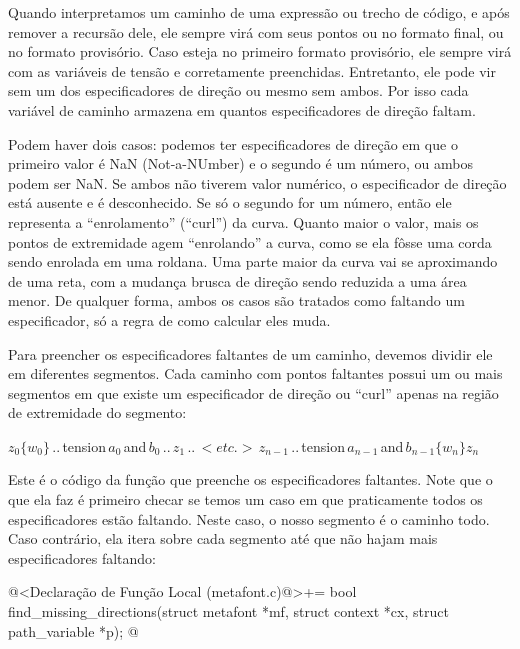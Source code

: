 
Quando interpretamos um caminho de uma expressão ou trecho de código,
e após remover a recursão dele, ele sempre virá com seus pontos ou no
formato final, ou no formato provisório. Caso esteja no primeiro
formato provisório, ele sempre virá com as variáveis de tensão
e  corretamente preenchidas. Entretanto, ele pode
vir sem um dos especificadores de direção ou mesmo sem ambos. Por isso
cada variável de caminho armazena
em  quantos
especificadores de direção faltam.

Podem haver dois casos: podemos ter especificadores de direção em que
o primeiro valor é NaN (Not-a-NUmber) e o segundo é um número, ou
ambos podem ser NaN. Se ambos não tiverem valor numérico, o
especificador de direção está ausente e é desconhecido. Se só o
segundo for um número, então ele representa a ``enrolamento''
(``curl'') da curva. Quanto maior o valor, mais os pontos de
extremidade agem ``enrolando'' a curva, como se ela fôsse uma corda
sendo enrolada em uma roldana. Uma parte maior da curva vai se
aproximando de uma reta, com a mudança brusca de direção sendo
reduzida a uma área menor. De qualquer forma, ambos os casos são
tratados como faltando um especificador, só a regra de como calcular
eles muda.

Para preencher os especificadores faltantes de um caminho, devemos
dividir ele em diferentes segmentos. Cada caminho com pontos faltantes
possui um ou mais segmentos em que existe um especificador de direção
ou ``curl'' apenas na região de extremidade do segmento:

$z_0\{w_0\}\,..\, $tension$\, a_0\, $and$\, b_0\, ..\, z_1\, ..\,
<etc.>\, z_{n-1}\, ..\, $tension$\, a_{n-1}\, $and$\,
b_{n-1} \{w_n\}z_{n}$

Este é o código da função que preenche os especificadores
faltantes. Note que o que ela faz é primeiro checar se temos um caso
em que praticamente todos os especificadores estão faltando. Neste
caso, o nosso segmento é o caminho todo. Caso contrário, ela itera
sobre cada segmento até que não hajam mais especificadores faltando:

\iniciocodigo
@<Declaração de Função Local (metafont.c)@>+=
bool find_missing_directions(struct metafont *mf, struct context *cx,
                             struct path_variable *p);
@
\fimcodigo

